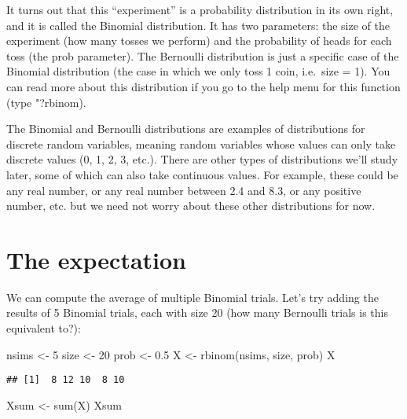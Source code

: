 \documentclass[
]{book}
\newenvironment{Shaded}{\begin{snugshade}}{\end{snugshade}}
\newcommand{\DecValTok}[1]{\textcolor[rgb]{0.00,0.00,0.81}{#1}}
\newcommand{\FloatTok}[1]{\textcolor[rgb]{0.00,0.00,0.81}{#1}}
\newcommand{\FunctionTok}[1]{\textcolor[rgb]{0.00,0.00,0.00}{#1}}
\newcommand{\NormalTok}[1]{#1}
\newcommand{\OtherTok}[1]{\textcolor[rgb]{0.56,0.35,0.01}{#1}}
\begin{document}
It turns out that this ``experiment'' is a probability distribution in its own right, and it is called the Binomial distribution. It has two parameters: the size of the experiment (how many tosses we perform) and the probability of heads for each toss (the prob parameter). The Bernoulli distribution is just a specific case of the Binomial distribution (the case in which we only toss 1 coin, i.e.~size = 1). You can read more about this distribution if you go to the help menu for this function (type "?rbinom).

The Binomial and Bernoulli distributions are examples of distributions for discrete random variables, meaning random variables whose values can only take discrete values (0, 1, 2, 3, etc.). There are other types of distributions we'll study later, some of which can also take continuous values. For example, these could be any real number, or any real number between 2.4 and 8.3, or any positive number, etc. but we need not worry about these other distributions for now.

\hypertarget{the-expectation}{%
\section{The expectation}\label{the-expectation}}

We can compute the average of multiple Binomial trials. Let's try adding the results of 5 Binomial trials, each with size 20 (how many Bernoulli trials is this equivalent to?):

\begin{Shaded}
\begin{Highlighting}[]
\NormalTok{nsims }\OtherTok{\textless{}{-}} \DecValTok{5}
\NormalTok{size }\OtherTok{\textless{}{-}} \DecValTok{20}
\NormalTok{prob }\OtherTok{\textless{}{-}} \FloatTok{0.5}
\NormalTok{X }\OtherTok{\textless{}{-}} \FunctionTok{rbinom}\NormalTok{(nsims, size, prob)}
\NormalTok{X}
\end{Highlighting}
\end{Shaded}

\begin{verbatim}
## [1]  8 12 10  8 10
\end{verbatim}

\begin{Shaded}
\begin{Highlighting}[]
\NormalTok{Xsum }\OtherTok{\textless{}{-}} \FunctionTok{sum}\NormalTok{(X)}
\NormalTok{Xsum}
\end{Highlighting}
\end{Shaded}
\end{document}
